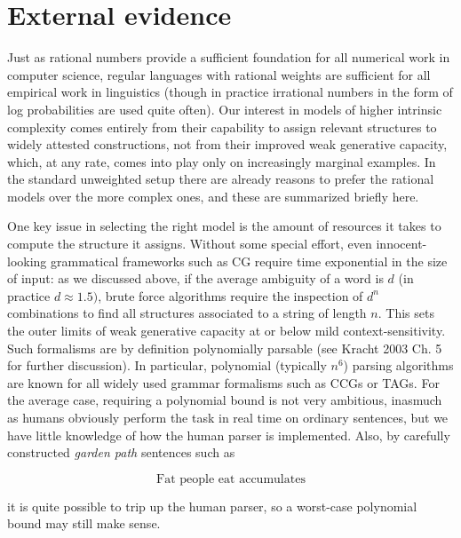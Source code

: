\section{External evidence}

Just as rational numbers provide a sufficient foundation for all numerical
work in computer science, regular languages with rational weights are
sufficient for all empirical work in linguistics (though in practice
irrational numbers in the form of log probabilities are used quite often).
Our interest in models of higher intrinsic complexity comes entirely from
their capability to assign relevant structures to widely attested
constructions, not from their improved weak generative capacity, which, at any
rate, comes into play only on increasingly marginal examples.  In the standard
unweighted setup there are already reasons to prefer the rational models over
the more complex ones, and these are summarized briefly here.

One key issue in selecting the right model is the amount of resources it takes
to compute the structure it assigns. Without some special effort, even
innocent-looking grammatical frameworks such as CG require time exponential in
the size of input: as we discussed above, if the average ambiguity of a word
is $d$ (in practice $d \approx 1.5)$, brute force algorithms require the
inspection of $d^n$ combinations to find all structures associated to a string
of length $n$. This sets the outer limits of weak generative capacity at or
below mild context-sensitivity. Such formalisms are by definition polynomially
parsable (see Kracht 2003 Ch. 5 for further discussion). In particular,
polynomial (typically $n^6$) parsing algorithms are known for all widely used
grammar formalisms such as CCGs or TAGs. For the average case, requiring a
polynomial bound is not very ambitious, inasmuch as humans obviously perform
the task in real time on ordinary sentences, but we have little knowledge of
how the human parser is implemented. Also, by carefully constructed {\it
garden path} sentences such as 

\begin{equation}
\text{Fat people eat accumulates} 
\end{equation}

\smallskip\noindent it is quite possible to trip up the human parser, so a
worst-case polynomial bound may still make sense.

